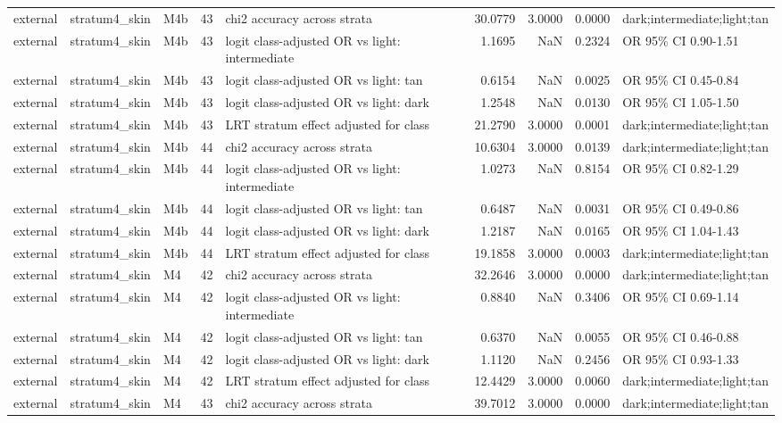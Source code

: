 \begin{tabular}{lllrlrrrl}
external & stratum4\_skin & M4b & 43 & chi2 accuracy across strata & 30.0779 & 3.0000 & 0.0000 & dark;intermediate;light;tan \\
external & stratum4\_skin & M4b & 43 & logit class-adjusted OR vs light: intermediate & 1.1695 & NaN & 0.2324 & OR 95\% CI 0.90-1.51 \\
external & stratum4\_skin & M4b & 43 & logit class-adjusted OR vs light: tan & 0.6154 & NaN & 0.0025 & OR 95\% CI 0.45-0.84 \\
external & stratum4\_skin & M4b & 43 & logit class-adjusted OR vs light: dark & 1.2548 & NaN & 0.0130 & OR 95\% CI 1.05-1.50 \\
external & stratum4\_skin & M4b & 43 & LRT stratum effect adjusted for class & 21.2790 & 3.0000 & 0.0001 & dark;intermediate;light;tan \\
external & stratum4\_skin & M4b & 44 & chi2 accuracy across strata & 10.6304 & 3.0000 & 0.0139 & dark;intermediate;light;tan \\
external & stratum4\_skin & M4b & 44 & logit class-adjusted OR vs light: intermediate & 1.0273 & NaN & 0.8154 & OR 95\% CI 0.82-1.29 \\
external & stratum4\_skin & M4b & 44 & logit class-adjusted OR vs light: tan & 0.6487 & NaN & 0.0031 & OR 95\% CI 0.49-0.86 \\
external & stratum4\_skin & M4b & 44 & logit class-adjusted OR vs light: dark & 1.2187 & NaN & 0.0165 & OR 95\% CI 1.04-1.43 \\
external & stratum4\_skin & M4b & 44 & LRT stratum effect adjusted for class & 19.1858 & 3.0000 & 0.0003 & dark;intermediate;light;tan \\
external & stratum4\_skin & M4 & 42 & chi2 accuracy across strata & 32.2646 & 3.0000 & 0.0000 & dark;intermediate;light;tan \\
external & stratum4\_skin & M4 & 42 & logit class-adjusted OR vs light: intermediate & 0.8840 & NaN & 0.3406 & OR 95\% CI 0.69-1.14 \\
external & stratum4\_skin & M4 & 42 & logit class-adjusted OR vs light: tan & 0.6370 & NaN & 0.0055 & OR 95\% CI 0.46-0.88 \\
external & stratum4\_skin & M4 & 42 & logit class-adjusted OR vs light: dark & 1.1120 & NaN & 0.2456 & OR 95\% CI 0.93-1.33 \\
external & stratum4\_skin & M4 & 42 & LRT stratum effect adjusted for class & 12.4429 & 3.0000 & 0.0060 & dark;intermediate;light;tan \\
external & stratum4\_skin & M4 & 43 & chi2 accuracy across strata & 39.7012 & 3.0000 & 0.0000 & dark;intermediate;light;tan \\

\end{tabular}
